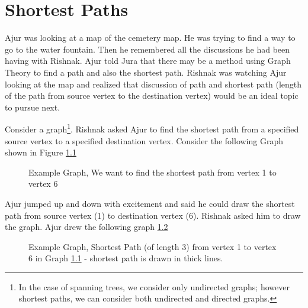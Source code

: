 \chapter{Shortest Paths}
Ajur was looking at a map of the cemetery map. He was trying to find a way to go to the water fountain. Then he remembered all the discussions he had been having with Rishnak. Ajur told Jura that there may be a method using Graph Theory to find a path and also the shortest path. Rishnak was watching Ajur looking at the map and realized that discussion of path and shortest path (length of the path from source vertex to the destination vertex) would be an ideal topic to pursue next.

Consider a graph\footnote{In the case of spanning trees, we consider only undirected graphs; however shortest paths, we can consider both undirected and directed graphs.}. Rishnak asked Ajur to find the shortest path from a specified source vertex to a specified destination vertex. Consider the following Graph shown in Figure \ref{12g1}
\begin{figure}
\begin{center}
\caption{ Example Graph, We want to find the shortest path from vertex 1 to vertex 6}\label{12g1}
\end{center}
\end{figure}

Ajur jumped up and down with excitement and said he could draw the shortest path from source vertex (1) to destination vertex (6). Rishnak asked him to draw the graph. Ajur drew the following graph \ref{12g2}

\begin{figure}
\begin{center}
\caption{ Example Graph, Shortest Path (of length 3) from vertex 1 to vertex 6 in Graph \ref{12g1} - shortest path is drawn in thick lines.}\label{12g2}
\end{center}
\end{figure}

